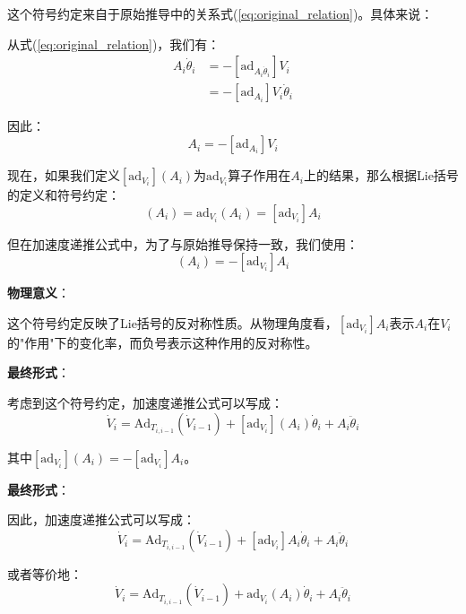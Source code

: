 \documentclass[12pt,a4paper]{article}
\begin{document}
这个符号约定来自于原始推导中的关系式(\ref{eq:original_relation})。具体来说：

从式(\ref{eq:original_relation})，我们有：
\begin{align}
[\text{ad}_{V_i}] A_i \dot{\theta}_i &= -[\text{ad}_{A_i \dot{\theta}_i}] V_i \\
&= -[\text{ad}_{A_i}] V_i \dot{\theta}_i
\end{align}

因此：
\begin{equation}
[\text{ad}_{V_i}] A_i = -[\text{ad}_{A_i}] V_i
\end{equation}

现在，如果我们定义$[\text{ad}_{V_i}](A_i)$为$\text{ad}_{V_i}$算子作用在$A_i$上的结果，那么根据Lie括号的定义和符号约定：
\begin{equation}
[\text{ad}_{V_i}](A_i) = \text{ad}_{V_i}(A_i) = [\text{ad}_{V_i}] A_i
\end{equation}

但在加速度递推公式中，为了与原始推导保持一致，我们使用：
\begin{equation}
[\text{ad}_{V_i}](A_i) = -[\text{ad}_{V_i}] A_i
\end{equation}

\textbf{物理意义}：

这个符号约定反映了Lie括号的反对称性质。从物理角度看，$[\text{ad}_{V_i}] A_i$表示$A_i$在$V_i$的"作用"下的变化率，而负号表示这种作用的反对称性。

\textbf{最终形式}：

考虑到这个符号约定，加速度递推公式可以写成：
\begin{equation}
\dot{V}_i = \text{Ad}_{T_{i,i-1}}(\dot{V}_{i-1}) + [\text{ad}_{V_i}](A_i) \dot{\theta}_i + A_i \ddot{\theta}_i
\end{equation}

其中$[\text{ad}_{V_i}](A_i) = -[\text{ad}_{V_i}] A_i$。

\textbf{最终形式}：

因此，加速度递推公式可以写成：
\begin{equation}
\dot{V}_i = \text{Ad}_{T_{i,i-1}}(\dot{V}_{i-1}) + [\text{ad}_{V_i}] A_i \dot{\theta}_i + A_i \ddot{\theta}_i
\end{equation}

或者等价地：
\begin{equation}
\dot{V}_i = \text{Ad}_{T_{i,i-1}}(\dot{V}_{i-1}) + \text{ad}_{V_i}(A_i) \dot{\theta}_i + A_i \ddot{\theta}_i
\end{equation}
\end{document}
